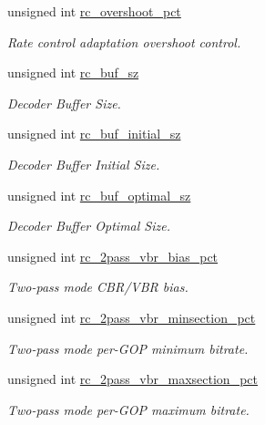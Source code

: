 \begin{DoxyCompactItemize}
unsigned int \hyperlink{structvpx__codec__enc__cfg_a4f2fbd015c1b1f395cc4a4b03d4ead5f}{rc\-\_\-overshoot\-\_\-pct}
\begin{DoxyCompactList}\small\item\em Rate control adaptation overshoot control. \end{DoxyCompactList}\item 
unsigned int \hyperlink{structvpx__codec__enc__cfg_a61866272bb588cd86d28834f420430f0}{rc\-\_\-buf\-\_\-sz}
\begin{DoxyCompactList}\small\item\em Decoder Buffer Size. \end{DoxyCompactList}\item 
unsigned int \hyperlink{structvpx__codec__enc__cfg_aa9e4d6405994ef42d61d478cf6e0d5e0}{rc\-\_\-buf\-\_\-initial\-\_\-sz}
\begin{DoxyCompactList}\small\item\em Decoder Buffer Initial Size. \end{DoxyCompactList}\item 
unsigned int \hyperlink{structvpx__codec__enc__cfg_aafde485867e040a58504ad796e79e47f}{rc\-\_\-buf\-\_\-optimal\-\_\-sz}
\begin{DoxyCompactList}\small\item\em Decoder Buffer Optimal Size. \end{DoxyCompactList}\item 
unsigned int \hyperlink{structvpx__codec__enc__cfg_a21c21ff097890dc3a450731c9b504cf4}{rc\-\_\-2pass\-\_\-vbr\-\_\-bias\-\_\-pct}
\begin{DoxyCompactList}\small\item\em Two-\/pass mode C\-B\-R/\-V\-B\-R bias. \end{DoxyCompactList}\item 
unsigned int \hyperlink{structvpx__codec__enc__cfg_a21eb9fce0844ae07b617bf3f0a25f5a5}{rc\-\_\-2pass\-\_\-vbr\-\_\-minsection\-\_\-pct}
\begin{DoxyCompactList}\small\item\em Two-\/pass mode per-\/\-G\-O\-P minimum bitrate. \end{DoxyCompactList}\item 
unsigned int \hyperlink{structvpx__codec__enc__cfg_ab5212050b71b2d9f4dc663caa496949e}{rc\-\_\-2pass\-\_\-vbr\-\_\-maxsection\-\_\-pct}
\begin{DoxyCompactList}\small\item\em Two-\/pass mode per-\/\-G\-O\-P maximum bitrate. \end{DoxyCompactList}\item 

\end{DoxyCompactItemize}
